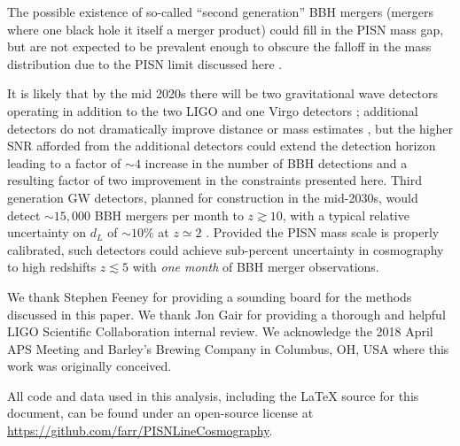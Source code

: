 \documentclass[modern]{aastex62}
\begin{document}
The possible existence of so-called ``second generation'' \ac{BBH} mergers
(mergers where one black hole it itself a merger product) could fill in the
\ac{PISN} mass gap, but are not expected to be prevalent enough to obscure the
falloff in the mass distribution due to the \ac{PISN} limit discussed here
\citep{Rodriguez2019}.

It is likely that by the mid 2020s there will be two gravitational wave
detectors operating in addition to the two LIGO and one Virgo detectors
\cite{ObsScenarios}; additional detectors do not dramatically improve distance
or mass estimates \citep{Vitale2017}, but the higher SNR afforded from the
additional detectors could extend the detection horizon leading to a factor of
$\sim 4$ increase in the number of \ac{BBH} detections and a resulting factor of
two improvement in the constraints presented here.  Third generation \ac{GW}
detectors, planned for construction in the mid-2030s, would detect $\sim 15,000$
\ac{BBH} mergers per month to $z \gtrsim 10$, with a typical relative
uncertainty on $d_L$ of $\sim 10 \%$ at $z \simeq 2$ \citep{Vitale2018}.
Provided the \ac{PISN} mass scale is properly calibrated, such detectors could
achieve sub-percent uncertainty in cosmography to high redshifts $z \lesssim 5$
with \emph{one month} of \ac{BBH} merger observations.

\acknowledgments

We thank Stephen Feeney for providing a sounding board for the methods discussed
in this paper.  We thank Jon Gair for providing a thorough and helpful LIGO
Scientific Collaboration internal review.  We acknowledge the 2018 April APS
Meeting and Barley's Brewing Company in Columbus, OH, USA where this work was
originally conceived.

All code and data used in this analysis, including the \LaTeX{} source for this
document, can be found under an open-source license at
\url{https://github.com/farr/PISNLineCosmography}.




\appendix

\setcounter{figure}{0}
\renewcommand{\figurename}{Extended Data Figure}
\renewcommand{\tablename}{Extended Data Table}
\end{document}
